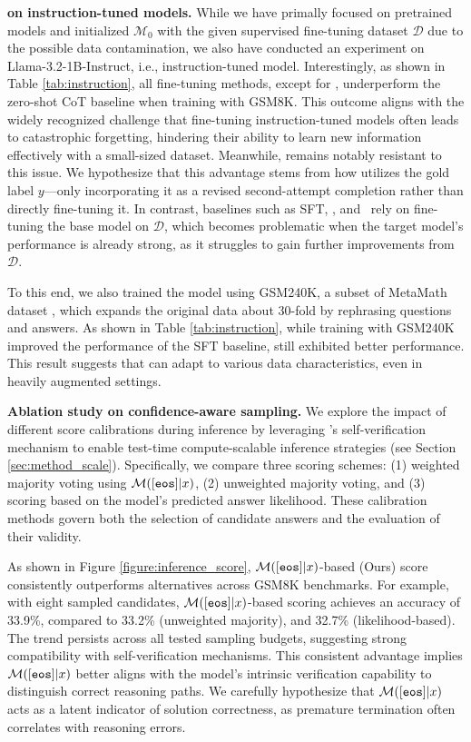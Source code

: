 
\textbf{\sname on instruction-tuned models.} 
While we have primally focused on pretrained models and initialized $\mathcal{M}_0$ with the given supervised fine-tuning dataset $\mathcal{D}$ due to the possible data contamination, we also have conducted an experiment on Llama-3.2-1B-Instruct, i.e., instruction-tuned model.
Interestingly, as shown in Table \ref{tab:instruction}, all fine-tuning methods, except for \sname, underperform the zero-shot CoT baseline when training with GSM8K. 
This outcome aligns with the widely recognized challenge that fine-tuning instruction-tuned models often leads to catastrophic forgetting, hindering their ability to learn new information effectively with a small-sized dataset.
Meanwhile, \sname remains notably resistant to this issue. We hypothesize that this advantage stems from how \sname utilizes the gold label $y$—only incorporating it as a revised second-attempt completion rather than directly fine-tuning it. In contrast, baselines such as SFT, \baserft, and \basestarplus~rely on fine-tuning the base model on $\mathcal{D}$, which becomes problematic when the target model’s performance is already strong, as it struggles to gain further improvements from $\mathcal{D}$. 

To this end, we also trained the model using GSM240K, a subset of MetaMath dataset \citep{yu2024metamath}, which expands the original data about 30-fold by rephrasing questions and answers. 
As shown in Table \ref{tab:instruction}, while training with GSM240K improved the performance of the SFT baseline, \sname still exhibited better performance. 
This result suggests that \sname can adapt to various data characteristics, even in heavily augmented settings.


\textbf{Ablation study on confidence-aware sampling.} 
We explore the impact of different score calibrations during inference by leveraging \sname's self-verification mechanism to enable test-time compute-scalable inference strategies (see Section \ref{sec:method_scale}). 
Specifically, we compare three scoring schemes: (1) weighted majority voting using \( \mathcal{M}(\text{$[\mathtt{eos}]$}|x) \), (2) unweighted majority voting, and (3) scoring based on the model's predicted answer likelihood. 
These calibration methods govern both the selection of candidate answers and the evaluation of their validity. 

As shown in Figure \ref{figure:inference_score}, \( \mathcal{M}(\text{$[\mathtt{eos}]$}|x) \)-based (Ours) score consistently outperforms alternatives across GSM8K benchmarks. 
For example, with eight sampled candidates, \( \mathcal{M}(\text{$[\mathtt{eos}]$}|x) \)-based scoring achieves an accuracy of 33.9\%, compared to 33.2\% (unweighted majority), and 32.7\% (likelihood-based). 
The trend persists across all tested sampling budgets, suggesting strong compatibility with self-verification mechanisms. 
This consistent advantage implies \( \mathcal{M}(\text{$[\mathtt{eos}]$}|x) \) better aligns with the model's intrinsic verification capability to distinguish correct reasoning paths. 
We carefully hypothesize that \( \mathcal{M}(\text{$[\mathtt{eos}]$}|x) \) acts as a latent indicator of solution correctness, as premature termination often correlates with reasoning errors.


